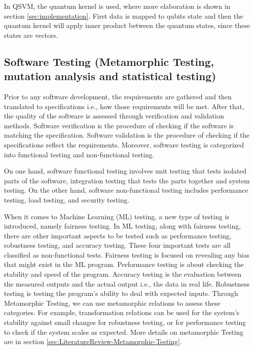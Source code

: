 \documentclass[12pt,a4paper]{article}
\begin{document}
	In QSVM, the quantum kernel is used, where more elaboration is shown in section \ref{sec:implementation}. First data is mapped to qubits state and then the quantum kernel will apply inner product between the quantum states, since these states are vectors.
	
	\subsection{Software Testing (Metamorphic Testing, mutation analysis and statistical testing)}
	
	Prior to any software development, the requirements are gathered and then translated to specifications i.e., how those requirements will be met. After that, the quality of the software is assessed through verification and validation methods. Software verification is the procedure of checking if the software is matching the specification. Software validation is the procedure of checking if the specifications reflect the requirements. Moreover, software testing is categorized into functional testing and non-functional testing.
	
	On one hand, software functional testing involves unit testing that tests isolated parts of the software, integration testing that tests the parts together and system testing. On the other hand, software non-functional testing includes performance testing, load testing, and security testing.
	
	When it comes to Machine Learning (ML) testing, a new type of testing is introduced, namely fairness testing. In ML testing, along with fairness testing, there are other important aspects to be tested such as performance testing, robustness testing, and accuracy testing. These four important tests are all classified as non-functional tests. Fairness testing is focused on revealing any bias that might exist in the ML program. Performance testing is about checking the stability and speed of the program. Accuracy testing is the evaluation between the measured outputs and the actual output i.e., the data in real life. Robustness testing is testing the program's ability to deal with expected inputs. Through Metamorphic Testing, we can use metamorphic relations to assess these categories. For example, transformation relations can be used for the system's stability against small changes for robustness testing, or for performance testing to check if the system scales as expected. More details on metamorphic Testing are in section \ref{sec:LiteratureReview-Metamorphic-Testing}.
 
\end{document}
